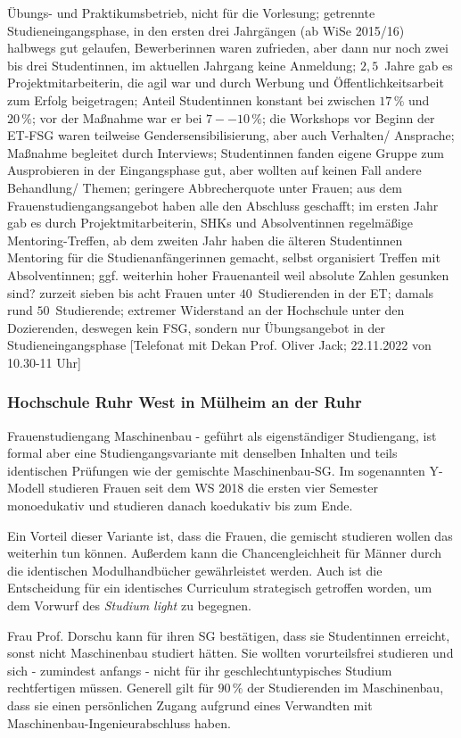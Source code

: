 \documentclass[a4paper, 12 pt]{IEEEtran}
\begin{document}
Übungs- und Praktikumsbetrieb, nicht für die Vorlesung; getrennte Studieneingangsphase, in den ersten drei Jahrgängen (ab WiSe 2015/16) halbwegs gut gelaufen, Bewerberinnen waren zufrieden, aber dann nur noch zwei bis drei Studentinnen, im aktuellen Jahrgang keine Anmeldung; $2,5$~Jahre gab es Projektmitarbeiterin, die agil war und durch Werbung und Öffentlichkeitsarbeit zum Erfolg beigetragen; Anteil Studentinnen konstant bei zwischen $17\,\%$ und $20\,\%$; vor der Maßnahme war er bei $7--10\,\%$; die Workshops vor Beginn der ET-FSG waren teilweise Gendersensibilisierung, aber auch Verhalten/ Ansprache; Maßnahme begleitet durch Interviews; Studentinnen fanden eigene Gruppe zum Ausprobieren in der Eingangsphase gut, aber wollten auf keinen Fall andere Behandlung/ Themen; geringere Abbrecherquote unter Frauen; aus dem Frauenstudiengangsangebot haben alle den Abschluss geschafft; im ersten Jahr gab es durch Projektmitarbeiterin, SHKs und Absolventinnen regelmäßige Mentoring-Treffen, ab dem zweiten Jahr haben die älteren Studentinnen Mentoring für die Studienanfängerinnen gemacht, selbst organisiert Treffen mit Absolventinnen; ggf. weiterhin hoher Frauenanteil weil absolute Zahlen gesunken sind? zurzeit sieben bis acht Frauen unter $40$~Studierenden in der ET; damals rund $50$~Studierende; extremer Widerstand an der Hochschule unter den Dozierenden, deswegen kein FSG, sondern nur Übungsangebot in der Studieneingangsphase
[Telefonat mit Dekan Prof. Oliver Jack; 22.11.2022 von 10.30-11 Uhr]

\subsubsection{Hochschule Ruhr West in Mülheim an der Ruhr}
Frauenstudiengang Maschinenbau - geführt als eigenständiger Studiengang, ist formal aber eine Studiengangsvariante mit denselben Inhalten und teils identischen Prüfungen wie der gemischte Maschinenbau-SG. Im sogenannten Y-Modell studieren Frauen seit dem WS 2018 die ersten vier Semester monoedukativ und studieren danach koedukativ bis zum Ende.

Ein Vorteil dieser Variante ist, dass die Frauen, die gemischt studieren wollen das weiterhin tun können. Außerdem kann die Chancengleichheit für Männer durch die identischen Modulhandbücher gewährleistet werden. Auch ist die Entscheidung für ein identisches Curriculum strategisch getroffen worden, um dem Vorwurf des \emph{Studium light} zu begegnen.

Frau Prof. Dorschu kann für ihren SG bestätigen, dass sie Studentinnen erreicht, sonst nicht Maschinenbau studiert hätten. Sie wollten vorurteilsfrei studieren und sich - zumindest anfangs - nicht für ihr geschlechtuntypisches Studium rechtfertigen müssen. Generell gilt für $90\,\%$ der Studierenden im Maschinenbau, dass sie einen persönlichen Zugang aufgrund eines Verwandten mit Maschinenbau-Ingenieurabschluss haben.
\end{document}
